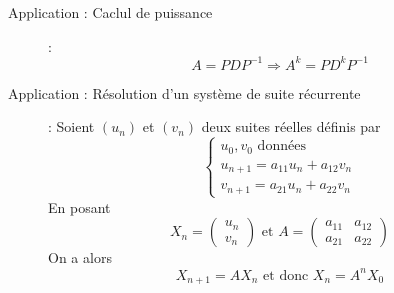 \begin{description}
\item[Application : Caclul de puissance] :
    \[ A=PDP^{-1}\Rightarrow A^k=PD^kP^{-1} \]
\item[Application : Résolution d'un système de suite récurrente] : Soient $(u_n)$ et $(v_n)$ deux suites réelles définis par
    \[
        \begin{cases}
            u_0,v_0\textrm{ données}\\
            u_{n+1}=a_{11}u_n+a_{12}v_n\\
            v_{n+1}=a_{21}u_n+a_{22}v_n
        \end{cases}
    \]
    En posant
    \[
    X_n=\begin{pmatrix}u_n\\ v_n\end{pmatrix}
        \textrm{ et }
    A=\begin{pmatrix}
        a_{11} & a_{12} \\
        a_{21} & a_{22}
    \end{pmatrix}
    \]
    On a alors
    \[
        X_{n+1}=AX_n\textrm{ et donc } X_n=A^nX_0
    \]
\end{description}